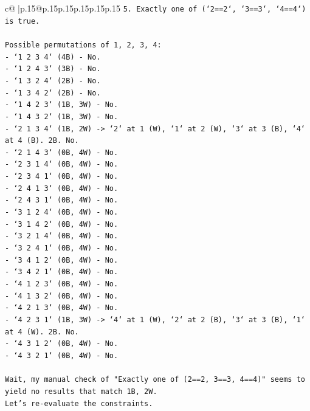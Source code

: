 \documentclass{article}
\begin{document}
{\begin{supertabular}{c@{$\;$}|p{.15\linewidth}@{}p{.15\linewidth}p{.15\linewidth}p{.15\linewidth}p{.15\linewidth}p{.15\linewidth}}
{{{\texttt{5. Exactly one of (`2==2`, `3==3`, `4==4`) is true.} \\
\\ 
\texttt{Possible permutations of 1, 2, 3, 4:} \\
\texttt{{-} `1 2 3 4` (4B) {-} No.} \\
\texttt{{-} `1 2 4 3` (3B) {-} No.} \\
\texttt{{-} `1 3 2 4` (2B) {-} No.} \\
\texttt{{-} `1 3 4 2` (2B) {-} No.} \\
\texttt{{-} `1 4 2 3` (1B, 3W) {-} No.} \\
\texttt{{-} `1 4 3 2` (1B, 3W) {-} No.} \\
\texttt{{-} `2 1 3 4` (1B, 2W) {-}> `2` at 1 (W), `1` at 2 (W), `3` at 3 (B), `4` at 4 (B). 2B. No.} \\
\texttt{{-} `2 1 4 3` (0B, 4W) {-} No.} \\
\texttt{{-} `2 3 1 4` (0B, 4W) {-} No.} \\
\texttt{{-} `2 3 4 1` (0B, 4W) {-} No.} \\
\texttt{{-} `2 4 1 3` (0B, 4W) {-} No.} \\
\texttt{{-} `2 4 3 1` (0B, 4W) {-} No.} \\
\texttt{{-} `3 1 2 4` (0B, 4W) {-} No.} \\
\texttt{{-} `3 1 4 2` (0B, 4W) {-} No.} \\
\texttt{{-} `3 2 1 4` (0B, 4W) {-} No.} \\
\texttt{{-} `3 2 4 1` (0B, 4W) {-} No.} \\
\texttt{{-} `3 4 1 2` (0B, 4W) {-} No.} \\
\texttt{{-} `3 4 2 1` (0B, 4W) {-} No.} \\
\texttt{{-} `4 1 2 3` (0B, 4W) {-} No.} \\
\texttt{{-} `4 1 3 2` (0B, 4W) {-} No.} \\
\texttt{{-} `4 2 1 3` (0B, 4W) {-} No.} \\
\texttt{{-} `4 2 3 1` (1B, 3W) {-}> `4` at 1 (W), `2` at 2 (B), `3` at 3 (B), `1` at 4 (W). 2B. No.} \\
\texttt{{-} `4 3 1 2` (0B, 4W) {-} No.} \\
\texttt{{-} `4 3 2 1` (0B, 4W) {-} No.} \\
\\ 
\texttt{Wait, my manual check of "Exactly one of (2==2, 3==3, 4==4)" seems to yield no results that match 1B, 2W.} \\
\texttt{Let's re{-}evaluate the constraints.} \\
}}}
\end{supertabular}}
\end{document}
